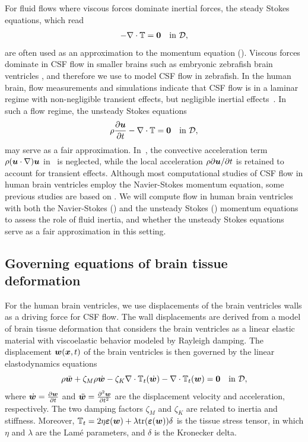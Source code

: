 \documentclass{template}
\begin{document}
For fluid flows where viscous forces dominate inertial 
forces, the steady Stokes equations, which read
\begin{equation}
    - \nabla\cdot\mathbb{T} = \bm{0} \quad\text{in }\mathcal{D},
    \label{eq:stokes_eq}
\end{equation}
are often used as an approximation to the momentum equation
().
Viscous forces dominate in CSF flow in smaller brains
such as embryonic zebrafish brain ventricles
\cite{Olstad2019CiliaryDevelopment, Herlyng2025AdvectionDiffusion},
and therefore we use  to model CSF flow
in zebrafish. In the human brain, flow measurements and simulations
indicate that CSF flow is in a laminar regime
with non-negligible transient effects, but negligible
inertial effects~\cite{Gholampour2018FSI, howden2008three}.
In such a flow regime, the unsteady Stokes equations
\begin{equation}
    \rho\frac{\partial \bm{u}}{\partial t} - \nabla\cdot\mathbb{T} = \bm{0} \quad\text{in }\mathcal{D},
    \label{eq:unsteady_stokes_eq}
\end{equation}
may serve as a fair approximation.
In~, the convective acceleration term
$\rho (\bm{u}\cdot\nabla)\bm{u}$ in~ is neglected,
while the local acceleration
$\rho\partial\bm{u}/\partial t$ is retained to account for transient effects.
Although most computational studies of CSF flow in human brain ventricles
employ the Navier-Stokes momentum equation, some previous
studies are based on 
\cite{Causemann2022HumanFramework, kelley2023cerebrospinal}.
We will compute flow in human brain ventricles with both the
Navier-Stokes () and the unsteady
Stokes () momentum equations to assess
the role of fluid inertia, and whether the unsteady Stokes equations
serve as a fair approximation in this setting.

\subsection{Governing equations of brain tissue deformation}
For the human brain ventricles, we use displacements of the brain
ventricles walls as a driving force for CSF flow. The wall displacements are 
derived from a model of brain tissue deformation that considers the brain
ventricles as a linear elastic material with viscoelastic
behavior modeled by Rayleigh damping. The displacement $\bm{w}(\bm{x}, t)$
of the brain ventricles is then governed by the linear elastodynamics
equations
\begin{equation}
    \rho\ddot{\bm{w}} + \zeta_M\rho\dot{\bm{w}} - \zeta_K\nabla\cdot\mathbb{T}_t(\dot{\bm{w}})
    - \nabla\cdot\mathbb{T}_t(\bm{w}) = \bm{0} \quad\text{in }\mathcal{D},
    \label{eq:strong_linear_elasticity_1}
\end{equation}
where $\dot{\bm{w}} = \frac{\partial \bm{w}}{\partial t}$ and $\ddot{\bm{w}} = \frac{\partial^2 \bm{w}}{\partial t^2}$
are the displacement velocity and acceleration, respectively.
The two damping factors $\zeta_M$ and $\zeta_K$
are related to inertia and stiffness. 
Moreover, $\mathbb{T}_t = 2\eta\bm{\varepsilon}(\bm{w}) + \lambda\mathrm{tr}(\bm{\varepsilon}(\bm{w}))\delta$ is the
tissue stress tensor, in which $\eta$ and $\lambda$ are the Lamé parameters,
and $\delta$ is the Kronecker delta. 
\end{document}
